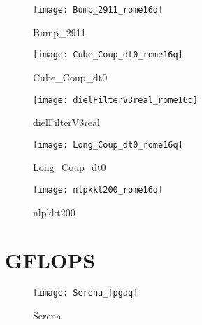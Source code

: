 \begin{figure}[H]
    \begin{center}
        \texttt{[image: Bump\_2911\_rome16q]}
    \end{center}
    \caption{Bump\_2911}
    \label{fig:Bump_2911_rome16q}
\end{figure}

\begin{figure}[H]
    \begin{center}
        \texttt{[image: Cube\_Coup\_dt0\_rome16q]}
    \end{center}
    \caption{Cube\_Coup\_dt0}
    \label{fig:Cube_Coup_dt0_rome16q}
\end{figure}

\begin{figure}[H]
    \begin{center}
        \texttt{[image: dielFilterV3real\_rome16q]}
    \end{center}
    \caption{dielFilterV3real}
    \label{fig:dielFilterV3real_rome16q}
\end{figure}



\begin{figure}[H]
    \begin{center}
        \texttt{[image: Long\_Coup\_dt0\_rome16q]}
    \end{center}
    \caption{Long\_Coup\_dt0}
    \label{fig:Long_Coup_dt0_rome16q}
\end{figure}

\begin{figure}[H]
    \begin{center}
        \texttt{[image: nlpkkt200\_rome16q]}
    \end{center}
    \caption{nlpkkt200}
    \label{fig:nlpkkt200_rome16q}
\end{figure}




\section{GFLOPS \fpgaq}

\begin{figure}[H]
    \begin{center}
        \texttt{[image: Serena\_fpgaq]}
    \end{center}
    \caption{Serena}
    \label{fig:Serena_fpgaq}
\end{figure}

